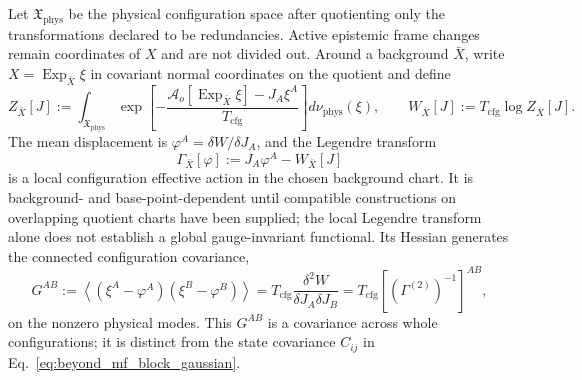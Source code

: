 \documentclass[11pt]{article}
\begin{document}
Let $\mathfrak{X}_{\mathrm{phys}}$ be the physical configuration space after quotienting only the transformations declared to be redundancies. Active epistemic frame changes remain coordinates of $X$ and are not divided out. Around a background $\bar{X}$, write $X=\operatorname{Exp}_{\bar{X}}\xi$ in covariant normal coordinates on the quotient and define
\begin{equation}
Z_{\bar{X}}[J]
:=\int_{\mathfrak{X}_{\mathrm{phys}}}
\exp\left[-\frac{\mathcal{A}_o[\operatorname{Exp}_{\bar{X}}\xi]-J_A\xi^A}{T_{\mathrm{cfg}}}\right]
d\nu_{\mathrm{phys}}(\xi),
\qquad
W_{\bar{X}}[J]:=T_{\mathrm{cfg}}\log Z_{\bar{X}}[J].
\label{eq:beyond_mf_generating_functional}
\end{equation}
The mean displacement is $\varphi^A=\delta W/\delta J_A$, and the Legendre transform
\begin{equation}
\Gamma_{\bar{X}}[\varphi]
:=J_A\varphi^A-W_{\bar{X}}[J]
\label{eq:beyond_mf_effective_action}
\end{equation}
is a local configuration effective action in the chosen background chart. It is background- and base-point-dependent until compatible constructions on overlapping quotient charts have been supplied; the local Legendre transform alone does not establish a global gauge-invariant functional. Its Hessian generates the connected configuration covariance,
\begin{equation}
G^{AB}
:=\left\langle(\xi^A-\varphi^A)(\xi^B-\varphi^B)\right\rangle
=T_{\mathrm{cfg}}\frac{\delta^2W}{\delta J_A\delta J_B}
=T_{\mathrm{cfg}}\left[\left(\Gamma^{(2)}\right)^{-1}\right]^{AB},
\label{eq:beyond_mf_connected_propagator}
\end{equation}
on the nonzero physical modes. This $G^{AB}$ is a covariance across whole configurations; it is distinct from the state covariance $C_{ij}$ in Eq.~\eqref{eq:beyond_mf_block_gaussian}.
\end{document}
